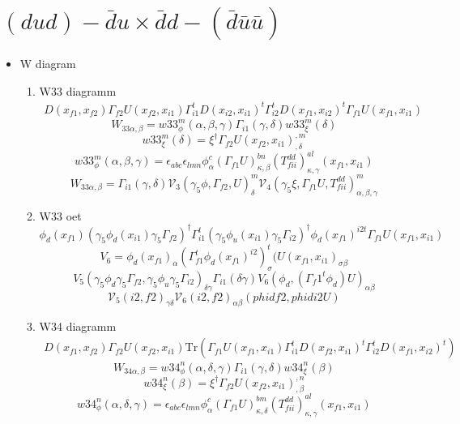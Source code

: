 \documentclass{article}[12pt]
\begin{document}
\section{$(dud)-\bar{d}u \times \bar{d}d-(\bar{d}\bar{u}\bar{u}) $}
\begin{itemize}
\item W diagram
\begin{enumerate}
\item W33 diagramm
\begin{eqnarray}
D(x_{f1},x_{f2})\Gamma_{f2}U(x_{f2},x_{i1})\Gamma_{i1}^tD(x_{i2},x_{i1})^t\Gamma_{i2}^tD(x_{f1},x_{i2})^t\Gamma_{f1}U(x_{f1},x_{i1})
\end{eqnarray}
$$
W_{33\alpha,\beta}=w33_{\phi}^{m}\left(\alpha,\beta,\gamma\right)\Gamma_{i1}\left(\gamma,\delta\right)w33_{\xi}^{m}\left(\delta\right)
$$
$$
w33_{\xi}^{m}\left(\delta\right)=\xi^{\dagger}\Gamma_{f2}U\left(x_{f2},x_{i1}\right)^{,m}_{,\delta}
$$
$$
w33_{\phi}^{m}\left(\alpha,\beta,\gamma\right)=\epsilon_{abc}\epsilon_{lmn}\phi^{c}_{\alpha}\left(\Gamma_{f1}U\right)^{bn}_{\kappa,\beta}\left(T_{fii}^{dd}\right)^{al}_{\kappa,\gamma}\left(x_{f1},x_{i1}\right)
$$
$$
W_{33\alpha,\beta}=\Gamma_{i1}\left(\gamma,\delta\right){\mathcal V}_{3}\left( \gamma_5\phi,\Gamma_{f2},U\right)^{m}_{\delta}{\mathcal V}_{4}\left(\gamma_5\xi,\Gamma_{f1}U,T_{fii}^{dd}\right)^{m}_{\alpha,\beta,\gamma}
$$
\item W33 oet
$$
\phi_d(x_{f1})(\gamma_5\phi_d(x_{i1})\gamma_5\Gamma_{f2})^\dagger
\Gamma_{i1}^t(\gamma_5\phi_u(x_{i1})\gamma_5\Gamma_{i2})^\dagger 
\phi_d(x_{f1})^{i2t}\Gamma_{f1}U(x_{f1},x_{i1})
$$
$$
V_6=\phi_d(x_{f1})_{\alpha}(\Gamma_{f1}^t\phi_d(x_{f1})^{i2})^t_{\sigma}(U(x_{f1},x_{i1})_{\sigma\beta}
$$
$$
V_5(\gamma_5\phi_d\gamma_5\Gamma_{f2},\gamma_5\phi_u\gamma_5\Gamma_{i2})_{\delta\gamma}\Gamma_{i1}(\delta\gamma)V_6(\phi_d, (\Gamma_f1^t\phi_d)U)_{\alpha\beta}
$$
$$
{\mathcal V}_5(i2,f2)_{\gamma\delta}{\mathcal V}_6(i2,f2)_{\alpha\beta}(phidf2,phidi2U)
$$
\item W34 diagramm
\begin{eqnarray}
D(x_{f1},x_{f2})\Gamma_{f2}U(x_{f2},x_{i1})\mathrm{Tr}\left(\Gamma_{f1}U(x_{f1},x_{i1})\Gamma_{i1}^tD(x_{f2},x_{i1})^t\Gamma_{i2}^tD(x_{f1},x_{i2})^t\right)
\end{eqnarray}
$$
W_{34\alpha,\beta}=w34_{\phi}^{n}\left(\alpha,\delta,\gamma\right)\Gamma_{i1}\left(\gamma,\delta\right)w34_{\xi}^{n}\left(\beta\right)
$$
$$
w34_{\xi}^{n}\left(\beta\right)=\xi^{\dagger}\Gamma_{f2}U\left(x_{f2},x_{i1}\right)^{,n}_{,\beta}
$$
$$
w34_{\phi}^{n}\left(\alpha,\delta,\gamma\right)=\epsilon_{abc}\epsilon_{lmn}\phi^{c}_{\alpha}\left(\Gamma_{f1}U\right)^{bm}_{\kappa,\delta}\left(T_{fii}^{dd}\right)^{al}_{\kappa,\gamma}\left(x_{f1},x_{i1}\right)
$$
\end{enumerate}
\end{itemize}
\end{document}

